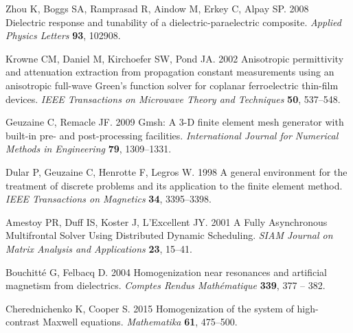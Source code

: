 \documentclass[%
 aip,
 amsmath,amssymb,
 reprint,%
linenumbers
]{revtex4-1}
\begin{document}
\begin{thebibliography}{99}
Zhou K, Boggs SA, Ramprasad R, Aindow M, Erkey C, Alpay SP. 2008  Dielectric
  response and tunability of a dielectric-paraelectric composite. {\em Applied
  Physics Letters} \textbf{93}, 102908.

Krowne CM, Daniel M, Kirchoefer SW, Pond JA. 2002  Anisotropic permittivity and
  attenuation extraction from propagation constant measurements using an
  anisotropic full-wave {Green}'s function solver for coplanar ferroelectric
  thin-film devices. {\em IEEE Transactions on Microwave Theory and Techniques}
  \textbf{50}, 537--548.

Geuzaine C, Remacle JF. 2009  Gmsh: {A} 3-{D} finite element mesh generator
  with built-in pre- and post-processing facilities. {\em International Journal
  for Numerical Methods in Engineering} \textbf{79}, 1309--1331.

Dular P, Geuzaine C, Henrotte F, Legros W. 1998  A general environment for the
  treatment of discrete problems and its application to the finite element
  method. {\em IEEE Transactions on Magnetics} \textbf{34}, 3395--3398.

Amestoy PR, Duff IS, Koster J, L'Excellent JY. 2001  A {Fully} {Asynchronous}
  {Multifrontal} {Solver} {Using} {Distributed} {Dynamic} {Scheduling}. {\em
  SIAM Journal on Matrix Analysis and Applications} \textbf{23}, 15--41.

Bouchitté G, Felbacq D. 2004  Homogenization near resonances and artificial
  magnetism from dielectrics. {\em Comptes Rendus Mathématique} \textbf{339},
  377 -- 382.

Cherednichenko K, Cooper S. 2015  Homogenization of the system of high-contrast
  {Maxwell} equations. {\em Mathematika} \textbf{61}, 475--500.

\end{thebibliography}


% 
% 
\end{document}
